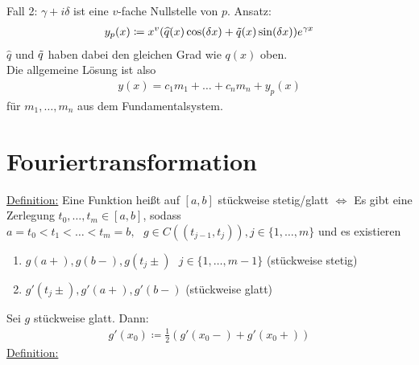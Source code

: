 \documentclass{article}
\begin{document}
Fall 2: $\gamma + i \delta$ ist eine $v$-fache Nullstelle von $p$. Ansatz:
\begin{align*}
    y_p(x) \coloneqq x^v(\widehat{q}(x)\cos(\delta x) + \Tilde{q}(x) \sin(\delta x))e^{\gamma x}
\end{align*}
$\widehat{q}$ und $\Tilde{q}$ haben dabei den gleichen Grad wie $q(x)$ oben. \\
Die allgemeine Lösung ist also
\begin{align*}
    y(x) = c_1m_1 + \ldots + c_nm_n + y_p(x)
\end{align*}
für $m_1, \ldots, m_n$ aus dem Fundamentalsystem.

\section{Fouriertransformation}
\underline{Definition:} Eine Funktion heißt auf $[a,b]$ stückweise stetig/glatt $\Leftrightarrow$ Es gibt eine Zerlegung $t_0, \ldots, t_m \in [a,b]$,
sodass $a=t_0 < t_1 < \ldots < t_m=b, \text{ } g \in C((t_{j-1},t_j)), j \in \{ 1, \ldots,m\}$ und es existieren
\begin{enumerate}
    \item $g(a+),g(b-),g(t_j\pm) \text{ } j \in \{ 1, \ldots, m-1\}$ (stückweise stetig)
    \item $g'(t_j \pm), g'(a+),g'(b-)$ (stückweise glatt)
\end{enumerate}
Sei $g$ stückweise glatt. Dann:
\begin{align*}
    g'(x_0) \coloneqq \frac{1}{2} (g'(x_0-) + g'(x_0+))
\end{align*}
\underline{Definition:} 
\end{document}
